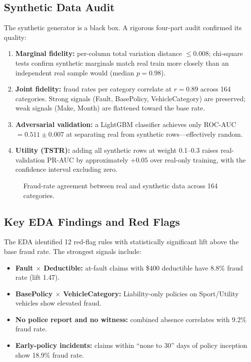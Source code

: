 \documentclass[12pt,a4paper]{article}
\begin{document}
\subsection{Synthetic Data Audit}

The synthetic generator is a black box.  A rigorous four-part audit confirmed its quality:

\begin{enumerate}
    \item \textbf{Marginal fidelity:} per-column total variation distance $\leq 0.008$; chi-square tests confirm synthetic marginals match real train more closely than an independent real sample would (median $p = 0.98$).
    \item \textbf{Joint fidelity:} fraud rates per category correlate at $r = 0.89$ across 164 categories.  Strong signals (Fault, BasePolicy, VehicleCategory) are preserved; weak signals (Make, Month) are flattened toward the base rate.
    \item \textbf{Adversarial validation:} a LightGBM classifier achieves only ROC-AUC $= 0.511 \pm 0.007$ at separating real from synthetic rows---effectively random.
    \item \textbf{Utility (TSTR):} adding all synthetic rows at weight 0.1--0.3 raises real-validation PR-AUC by approximately $+0.05$ over real-only training, with the confidence interval excluding zero.
\end{enumerate}

\begin{figure}[H]
\centering
{}
\caption{Fraud-rate agreement between real and synthetic data across 164 categories.}
\label{fig:synth_agreement}
\end{figure}

\subsection{Key EDA Findings and Red Flags}

The EDA identified 12 red-flag rules with statistically significant lift above the base fraud rate.  The strongest signals include:

\begin{itemize}
    \item \textbf{Fault $\times$ Deductible:} at-fault claims with \$400 deductible have 8.8\% fraud rate (lift 1.47).
    \item \textbf{BasePolicy $\times$ VehicleCategory:} Liability-only policies on Sport/Utility vehicles show elevated fraud.
    \item \textbf{No police report and no witness:} combined absence correlates with 9.2\% fraud rate.
    \item \textbf{Early-policy incidents:} claims within ``none to 30'' days of policy inception show 18.9\% fraud rate.
\end{itemize}
\end{document}
